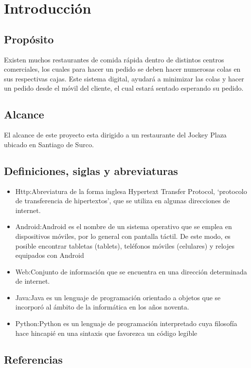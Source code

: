 \chapter{Introducción}

\section{Propósito}
Existen muchos restaurantes de comida rápida dentro de distintos centros comerciales, los cuales para hacer un pedido se deben hacer numerosas colas en sus respectivas cajas. Este sistema digital, ayudará a minimizar las colas y hacer un pedido desde el móvil del cliente, el cual estará sentado esperando su pedido.

\section{Alcance}
El alcance de este proyecto esta dirigido a un restaurante del Jockey Plaza ubicado en Santiago de Surco.

\section{Definiciones, siglas y abreviaturas}
\begin{itemize}
	\item Http:Abreviatura de la forma inglesa Hypertext Transfer Protocol, ‘protocolo de transferencia de hipertextos’, que se utiliza en algunas direcciones de internet.
	\item Android:Android es el nombre de un sistema operativo que se emplea en dispositivos móviles, por lo general con pantalla táctil. De este modo, es posible encontrar tabletas (tablets), teléfonos móviles (celulares) y relojes equipados con Android
	\item Web:Conjunto de información que se encuentra en una dirección determinada de internet.
	\item Java:Java es un lenguaje de programación orientado a objetos que se incorporó al ámbito de la informática en los años noventa.
	\item Python:Python es un lenguaje de programación interpretado cuya filosofía hace hincapié en una sintaxis que favorezca un código legible
	
\end{itemize}

\section{Referencias}